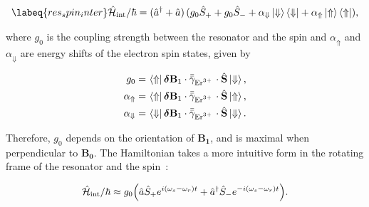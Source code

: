 \begin{equation}
    \labeq{res_spin_inter}
    \cH{int} / \hbar = (\hat{a}^\dagger + \hat{a}) \, (g_0 \hat{S}_+ + g_0 \hat{S}_- + \alpha_\Downarrow \ket{\Downarrow}\bra{\Downarrow} + \alpha_\Uparrow \ket{\Uparrow}\bra{\Uparrow}), 
\end{equation}

\noindent where $g_0$ is the coupling strength between the resonator and the spin and $\alpha_\Uparrow$ and $\alpha_\Downarrow$ are energy shifts of the electron spin states, given by

\begin{align}
\begin{split}
    g_0 =&\, \bra{\Uparrow} \boldsymbol{\delta}\mathbf{B}_1 \cdot \bar{\bar{\gamma}}_{\text{Er$^{3+}$\,}} \cdot \hat{\mathbf{S}} \ket{\Downarrow}, \\ 
    \alpha_\Uparrow =&\, \bra{\Uparrow} \boldsymbol{\delta}\mathbf{B}_1 \cdot \bar{\bar{\gamma}}_{\text{Er$^{3+}$\,}} \cdot \hat{\mathbf{S}} \ket{\Uparrow}, \\ 
    \alpha_\Downarrow =&\, \bra{\Downarrow} \boldsymbol{\delta}\mathbf{B}_1 \cdot \bar{\bar{\gamma}}_{\text{Er$^{3+}$\,}} \cdot \hat{\mathbf{S}} \ket{\Downarrow}.
\end{split}
\label{eq:coupling_strength_og}
\end{align}

Therefore, $g_0$ depends on the orientation of $\mathbf{B_1}$, and is maximal when perpendicular to $\mathbf{B_0}$. The Hamiltonian takes a more intuitive form in the rotating frame of the resonator and the spin~:



\begin{align}
\begin{split}
    \hat{\mathcal{H}}_{\text{int}}/\hbar \approx g_{0} \Big( \hat{a}\hat{S}_{+} e^{i(\omega_{s}-\omega_r)t} 
    + \hat{a}^{\dagger}\hat{S}_{-} e^{-i(\omega_{s}-\omega_r)t} \Big).
\end{split}
\end{align}

